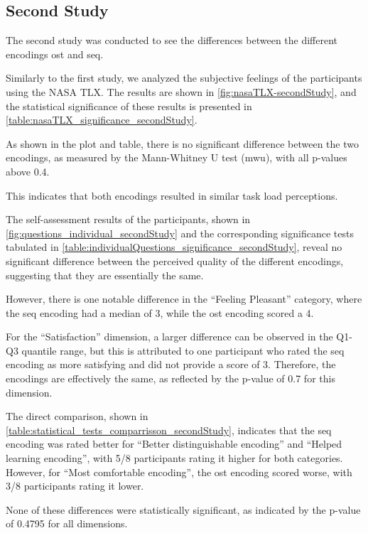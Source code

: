 \subsection{Second Study}
The second study was conducted to see the differences between the different encodings \gls{ost} and \gls{seq}.

Similarly to the first study, we analyzed the subjective feelings of the participants using the NASA TLX. The results are shown in \autoref{fig:nasaTLX-secondStudy}, and the statistical significance of these results is presented in \autoref{table:nasaTLX_significance_secondStudy}.

As shown in the plot and table, there is no significant difference between the two encodings, as measured by the Mann-Whitney U test (\gls{mwu}), with all p-values above 0.4.

This indicates that both encodings resulted in similar task load perceptions.

The self-assessment results of the participants, shown in \autoref{fig:questions_individual_secondStudy} and the corresponding significance tests tabulated in \autoref{table:individualQuestions_significance_secondStudy}, reveal no significant difference between the perceived quality of the different encodings, suggesting that they are essentially the same.

However, there is one notable difference in the \enquote{Feeling Pleasant} category, where the \gls{seq} encoding had a median of 3, while the \gls{ost} encoding scored a 4.

For the \enquote{Satisfaction} dimension, a larger difference can be observed in the Q1-Q3 quantile range, but this is attributed to one participant who rated the \gls{seq} encoding as more satisfying and did not provide a score of 3. Therefore, the encodings are effectively the same, as reflected by the p-value of 0.7 for this dimension.

The direct comparison, shown in \autoref{table:statistical_tests_comparrisson_secondStudy}, indicates that the \gls{seq} encoding was rated better for \enquote{Better distinguishable encoding} and \enquote{Helped learning encoding}, with 5/8 participants rating it higher for both categories. However, for \enquote{Most comfortable encoding}, the \gls{ost} encoding scored worse, with 3/8 participants rating it lower.

None of these differences were statistically significant, as indicated by the p-value of 0.4795 for all dimensions.

